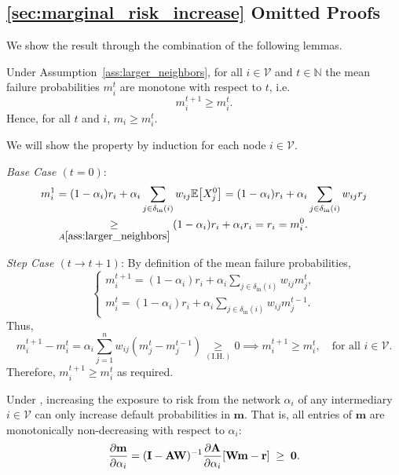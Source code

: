 \documentclass[mnsc,nonblindrev]{informs3}
\newcommand{\Exp}[1]{\mathbb E \left[ #1 \right]} %
\newcommand{\din}{\delta_{\text{in}}}
\newcommand{\rvec}{\mathbf{r}}
\newcommand{\A}{\mathbf{A}}
\newcommand{\W}{\mathbf{W}}
\newcommand{\I}{\mathbf{I}}
\newcommand{\mean}{m}
\newcommand{\meanvec}{\mathbf{\mean}}
\let\originalleft\left
\let\originalright\right
\renewcommand{\left}{\mathopen{}\mathclose\bgroup\originalleft}
\renewcommand{\right}{\aftergroup\egroup\originalright}
\renewenvironment{proof}[1][Proof]{%
  \par\noindent{\itshape #1.} \ignorespaces
}{%
  \hfill\Halmos\par
}
\begin{document}
\begin{APPENDICES}

\subsection{\cref{sec:marginal_risk_increase} Omitted Proofs}
\label{app:mean_increase_proofs}


\AssumptionMeanIncrease*

We show the result through the combination of the following lemmas.


\begin{lemma}
\label{lem:monotonicity}
Under Assumption~\ref{ass:larger_neighbors}, for all \(i \in \mathcal{V}\) and \(t \in \mathbb{N}\) the mean failure probabilities $\mean_i^t$ are monotone with respect to $t$, i.e.
\[
    \mean_i^{t+1} \geq \mean_i^t.
\]
Hence, for all \(t\) and \(i\), $\mean_i \geq \mean_i^t$.
\end{lemma}
\begin{proof}
We will show the property by induction for each node $i \in \mathcal{V}$.

\noindent \textit{Base Case $(t = 0)$}: 
\begin{align*}
    m_i^1 &= (1 - \alpha_i) r_i + \alpha_i \sum_{j \in \din(i)} w_{ij} \Exp{X_j^0} = (1 - \alpha_i) r_i + \alpha_i \sum_{j \in \din(i)} w_{ij} r_j \\
          &\underset{A\ref{ass:larger_neighbors}}{\geq} (1 - \alpha_i) r_i + \alpha_i r_i = r_i = m_i^0.
\end{align*}

\noindent \textit{Step Case $(t \rightarrow t+1)$}:  By definition of the mean failure probabilities,
\[
    \begin{cases}
        m_i^{t+1} = (1 - \alpha_i) r_i + \alpha_i \sum_{j \in \din(i)} w_{ij} m_j^t, \\
        m_i^t = (1 - \alpha_i) r_i + \alpha_i \sum_{j \in \din(i)} w_{ij} m_j^{t-1}.
    \end{cases}
\]
Thus,
\[    
    m_i^{t+1} - m_i^t = \alpha_i \sum_{j=1}^{n} w_{ij} (m_j^t - m_j^{t-1}) \underset{(\text{I.H.})}{\geq} 0 \implies m_i^{t+1} \geq m_i^t, \quad \text{for all } i \in \mathcal{V}.
\]
Therefore, $\mean_i^{t+1} \geq \mean_i^t$ as required.
\end{proof}


\begin{lemma}
\label{lem:alpha_monotonicity}
    Under , increasing the exposure to risk from the network $\alpha_i$ of any intermediary $i \in \mathcal{V}$ can only increase default probabilities in $\meanvec$.
    That is, all entries of $\meanvec$ are monotonically non-decreasing with respect to $\alpha_i$:
    \[
        \frac{\partial \meanvec}{\partial \alpha_i}
        = (\I-\A\W)^{-1} \frac{\partial \A}{\partial \alpha_i} \left[ \W\meanvec - \rvec \right]
        \;\geq\; \mathbf{0}.
    \]
\end{lemma}


\end{APPENDICES}
\end{document}
